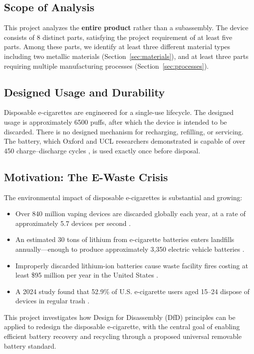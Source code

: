 \subsection{Scope of Analysis}

This project analyzes the \textbf{entire product} rather than a subassembly. The device consists of 8 distinct parts, satisfying the project requirement of at least five parts. Among these parts, we identify at least three different material types including two metallic materials (Section~\ref{sec:materials}), and at least three parts requiring multiple manufacturing processes (Section~\ref{sec:processes}).

\subsection{Designed Usage and Durability}

Disposable e-cigarettes are engineered for a single-use lifecycle. The designed usage is approximately 6500 puffs, after which the device is intended to be discarded. There is no designed mechanism for recharging, refilling, or servicing. The battery, which Oxford and UCL researchers demonstrated is capable of over 450 charge--discharge cycles \cite{williams2023}, is used exactly once before disposal.

\subsection{Motivation: The E-Waste Crisis}

The environmental impact of disposable e-cigarettes is substantial and growing:
\begin{itemize}
    \item Over 840 million vaping devices are discarded globally each year, at a rate of approximately 5.7 devices per second \cite{pirg2024}.
    \item An estimated 30 tons of lithium from e-cigarette batteries enters landfills annually---enough to produce approximately 3,350 electric vehicle batteries \cite{recyclenation2025}.
    \item Improperly discarded lithium-ion batteries cause waste facility fires costing at least \$95 million per year in the United States \cite{wmw2025}.
    \item A 2024 study found that 52.9\% of U.S. e-cigarette users aged 15--24 dispose of devices in regular trash \cite{truth2024}.
\end{itemize}

This project investigates how Design for Disassembly (DfD) principles can be applied to redesign the disposable e-cigarette, with the central goal of enabling efficient battery recovery and recycling through a proposed universal removable battery standard.

